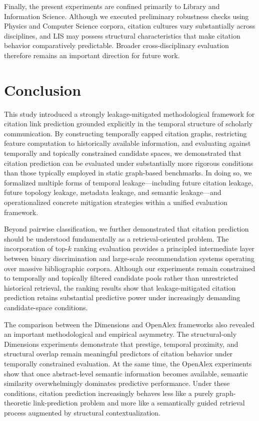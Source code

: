\documentclass[11pt,a4paper]{article}
\begin{document}
Finally, the present experiments are confined primarily to Library and Information Science. Although we executed preliminary robustness checks using Physics and Computer Science corpora, citation cultures vary substantially across disciplines, and LIS may possess structural characteristics that make citation behavior comparatively predictable. Broader cross-disciplinary evaluation therefore remains an important direction for future work.

\section{Conclusion}
\label{sec:conclusion}

This study introduced a strongly leakage-mitigated methodological framework for citation link prediction grounded explicitly in the temporal structure of scholarly communication. By constructing temporally capped citation graphs, restricting feature computation to historically available information, and evaluating against temporally and topically constrained candidate spaces, we demonstrated that citation prediction can be evaluated under substantially more rigorous conditions than those typically employed in static graph-based benchmarks. In doing so, we formalized multiple forms of temporal leakage---including future citation leakage, future topology leakage, metadata leakage, and semantic leakage---and operationalized concrete mitigation strategies within a unified evaluation framework.

Beyond pairwise classification, we further demonstrated that citation prediction should be understood fundamentally as a retrieval-oriented problem. The incorporation of top-\(k\) ranking evaluation provides a principled intermediate layer between binary discrimination and large-scale recommendation systems operating over massive bibliographic corpora. Although our experiments remain constrained to temporally and topically filtered candidate pools rather than unrestricted historical retrieval, the ranking results show that leakage-mitigated citation prediction retains substantial predictive power under increasingly demanding candidate-space conditions.

The comparison between the Dimensions and OpenAlex frameworks also revealed an important methodological and empirical asymmetry. The structural-only Dimensions experiments demonstrate that prestige, temporal proximity, and structural overlap remain meaningful predictors of citation behavior under temporally constrained evaluation. At the same time, the OpenAlex experiments show that once abstract-level semantic information becomes available, semantic similarity overwhelmingly dominates predictive performance. Under these conditions, citation prediction increasingly behaves less like a purely graph-theoretic link-prediction problem and more like a semantically guided retrieval process augmented by structural contextualization.
\end{document}
